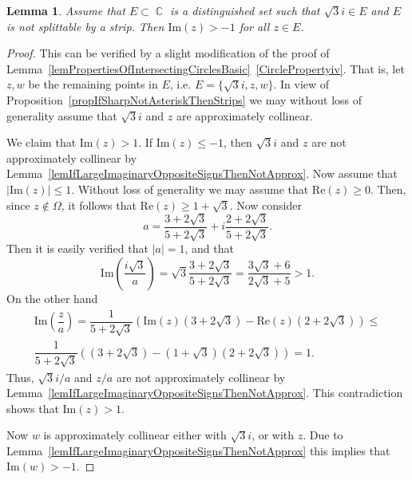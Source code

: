 \documentclass{amsart}
\numberwithin{equation}{section}
\newtheorem{lemma}[theorem]{Lemma}
\theoremstyle{definition}
\theoremstyle{remark}
\DeclareMathOperator{\CC}{\mathbb C}
\begin{document}
	\begin{lemma}\label{lemIfSqrt3AndNotSplittableByAStripThenHalfPlane}
 		Assume that $E \subset \CC$ is a distinguished set such that $\sqrt{3}i \in E$ and $E$ is not splittable by a strip. Then $\mathrm{Im}(z) > -1$ for all $z \in E$. 
	\end{lemma}
	\begin{proof}
		This can be verified by a slight modification of the proof of Lemma~\ref{lemPropertiesOfIntersectingCirclesBasic}~\ref{CirclePropertyiv}. That is, let $z,w$ be the remaining points in $E$, i.e. $E = \{\sqrt{3}i, z, w\}$. In view of Proposition~\ref{propIfSharpNotAsteriskThenStrips} we may without loss of generality assume that $\sqrt{3}i$ and $z$ are approximately collinear. 
		
		We claim that $\mathrm{Im}(z) > 1$. If $\mathrm{Im}(z) \le -1$, then $\sqrt{3}i$ and $z$ are not approximately collinear by Lemma~\ref{lemIfLargeImaginaryOppositeSignsThenNotApprox}. Now assume that $|\mathrm{Im}(z)| \le 1$. Without loss of generality we may assume that $\mathrm{Re}(z) \ge 0$. Then, since $z \notin \Omega$, it follows that $\mathrm{Re}(z) \ge 1 + \sqrt{3}$. Now consider 
		\[
		a = \dfrac{3 + 2\sqrt{3}}{5 + 2\sqrt{3}} + i\dfrac{2 + 2\sqrt{3}}{5 + 2\sqrt{3}}.
		\]
		Then it is easily verified that $|a| = 1$, and that
		\[
		\mathrm{Im}\left(\dfrac{i\sqrt{3}}{a}\right) = \sqrt{3}\dfrac{3 + 2\sqrt{3}}{5 + 2\sqrt{3}} = \dfrac{3\sqrt{3} + 6}{2\sqrt{3} + 5} > 1.
		\]
		On the other hand
		\begin{multline*}
			\mathrm{Im}\left(\dfrac{z}{a}\right) = \dfrac{1}{5 + 2\sqrt{3}} (\mathrm{Im}(z)(3 + 2\sqrt{3}) - \mathrm{Re}(z)(2 + 2\sqrt{3})) \le \\  \dfrac{1}{5 + 2\sqrt{3}} ((3 + 2\sqrt{3}) - (1 + \sqrt{3})(2 + 2\sqrt{3})) = 1.
		\end{multline*}
		Thus, $\sqrt{3}i/a$ and $z/a$ are not approximately collinear by Lemma~\ref{lemIfLargeImaginaryOppositeSignsThenNotApprox}. This contradiction shows that $\mathrm{Im}(z) > 1$.
		
		Now $w$ is approximately collinear either with $\sqrt{3}i$, or with $z$. Due to Lemma~\ref{lemIfLargeImaginaryOppositeSignsThenNotApprox} this implies that $\mathrm{Im}(w) > -1$.
	\end{proof}
	
\end{document}
